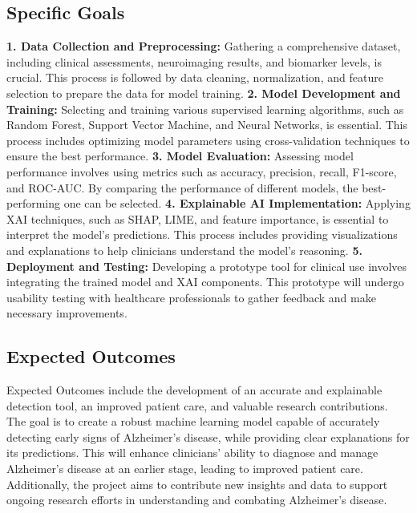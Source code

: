 \documentclass[a4paper,12pt]{report}
\begin{document}
    \subsection{Specific Goals}
    \textbf{1. Data Collection and Preprocessing:}
\newline Gathering a comprehensive dataset, including clinical assessments, neuroimaging results, and biomarker levels, is crucial. This process is followed by data cleaning, normalization, and feature selection to prepare the data for model training.
    \newline\textbf{2. Model Development and Training:}
\newline Selecting and training various supervised learning algorithms, such as Random Forest, Support Vector Machine, and Neural Networks, is essential. This process includes optimizing model parameters using cross-validation techniques to ensure the best performance.
    \newline\textbf{3. Model Evaluation:}
\newline Assessing model performance involves using metrics such as accuracy, precision, recall, F1-score, and ROC-AUC. By comparing the performance of different models, the best-performing one can be selected.
    \newline\textbf{4. Explainable AI Implementation:}
 \newline Applying XAI techniques, such as SHAP, LIME, and feature importance, is essential to interpret the model’s predictions. This process includes providing visualizations and explanations to help clinicians understand the model’s reasoning.
    \newline\textbf{5. Deployment and Testing:}
\newline Developing a prototype tool for clinical use involves integrating the trained model and XAI components. This prototype will undergo usability testing with healthcare professionals to gather feedback and make necessary improvements. 
    
    \subsection{Expected Outcomes}
Expected Outcomes include the development of an accurate and explainable detection tool, an improved patient care, and valuable research contributions.
The goal is to create a robust machine learning model capable of accurately detecting early signs of Alzheimer’s disease, while providing clear explanations for its predictions. This will enhance clinicians' ability to diagnose and manage Alzheimer’s disease at an earlier stage, leading to improved patient care. Additionally, the project aims to contribute new insights and data to support ongoing research efforts in understanding and combating Alzheimer’s disease.
\end{document}
